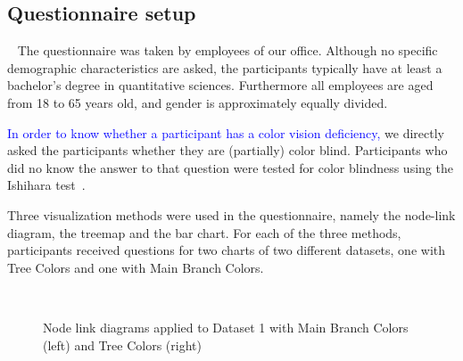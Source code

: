 \documentclass[journal]{vgtc}                %
\newcommand{\changedM}[1]{\textcolor{blue}{#1}}
\begin{document}
\subsection{Questionnaire setup}~\label{secusersetup}
The questionnaire was taken by employees of our office. %
Although no specific 
demographic characteristics are asked, the participants typically have at least a bachelor's degree in 
quantitative sciences. Furthermore all employees are aged from 18 to 65 years old, and gender is 
approximately equally divided.

\changedM{In order to know whether 
a participant has a color vision deficiency,} we directly asked the participants 
whether they are (partially) color blind. Participants who did no know the answer
to that question were tested for 
color blindness using the Ishihara test~\cite{ishihara}. 

Three visualization methods were used in the questionnaire, namely the node-link diagram, the treemap and the bar chart. For each of the three methods, participants received questions for two charts of two different datasets, one with Tree Colors and one with Main Branch Colors. 

\begin{figure}[tb]
  \centering
  \mbox{
  }
  \caption{Node link diagrams applied to Dataset 1 with Main Branch Colors (left) and Tree Colors (right)}\label{fig:graphSvy}

\end{figure}
\end{document}
